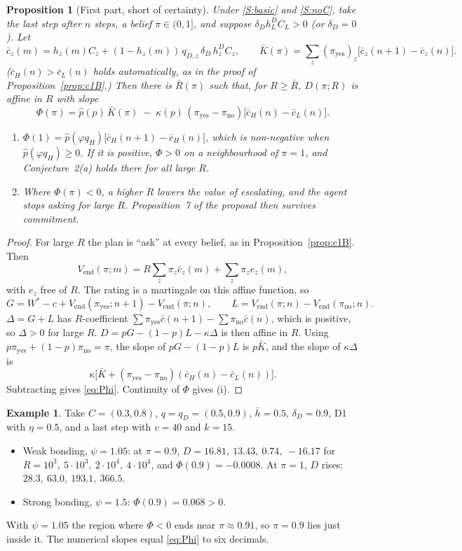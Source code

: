 \documentclass[11pt,a4paper]{article}
\newtheorem{proposition}[theorem]{Proposition}
\theoremstyle{definition}
\newtheorem{example}[theorem]{Example}
\theoremstyle{remark}
\newcommand{\Vend}{V_{\mathrm{end}}}
\newcommand{\pp}{\hat p}
\newcommand{\py}{\pi_{\mathrm{yes}}}
\newcommand{\pn}{\pi_{\mathrm{no}}}
\begin{document}
\begin{proposition}[First part, short of certainty]\label{prop:asym}
Under \ref{S:basic} and \ref{S:noC}, take the last step after $n$ steps, a belief $\pi\in(0,1]$, and suppose $\delta_Dh^D_LC_L>0$ (or $\delta_D=0$). Let
\[
\bar c_z(m)=h_z(m)C_z+(1-h_z(m))\,q_{D,z}\,\delta_D\,h^D_zC_z,\qquad \bar K(\pi)=\sum_z(\py)_z\bigl[\bar c_z(n+1)-\bar c_z(n)\bigr].
\]
($\bar c_H(n)>\bar c_L(n)$ holds automatically, as in the proof of Proposition~\ref{prop:c1B}.) Then there is $\bar R(\pi)$ such that, for $R\ge\bar R$, $D(\pi;R)$ is affine in $R$ with slope
\begin{equation}\label{eq:Phi}
\Phi(\pi)=\pp(p)\,\bar K(\pi)\;-\;\kappa(p)\,(\py-\pn)\bigl[\bar c_H(n)-\bar c_L(n)\bigr].
\end{equation}
\begin{enumerate}[label=(\roman*),nosep]
\item $\Phi(1)=\pp(\varphi q_H)\bigl[\bar c_H(n+1)-\bar c_H(n)\bigr]$, which is non-negative when $\pp(\varphi q_H)\ge0$. If it is positive, $\Phi>0$ on a neighbourhood of $\pi=1$, and Conjecture~2(a) holds there for all large $R$.
\item Where $\Phi(\pi)<0$, a higher $R$ lowers the value of escalating, and the agent stops asking for large $R$. Proposition~7 of the proposal then survives commitment.
\end{enumerate}
\end{proposition}

\begin{proof}
For large $R$ the plan is ``ask'' at every belief, as in Proposition~\ref{prop:c1B}. Then
\[
\Vend(\pi;m)=R\sum_z\pi_z\bar c_z(m)+\sum_z\pi_ze_z(m),
\]
with $e_z$ free of $R$. The rating is a martingale on this affine function, so
\[
G=W^*-c+\Vend(\py;n+1)-\Vend(\pi;n),\qquad L=\Vend(\pi;n)-\Vend(\pn;n).
\]
$\Delta=G+L$ has $R$-coefficient $\sum\py\bar c(n+1)-\sum\pn\bar c(n)$, which is positive, so $\Delta>0$ for large $R$. $D=pG-(1-p)L-\kappa\Delta$ is then affine in $R$. Using $p\py+(1-p)\pn=\pi$, the slope of $pG-(1-p)L$ is $p\bar K$, and the slope of $\kappa\Delta$ is
\[
\kappa\bigl[\bar K+(\py-\pn)(\bar c_H(n)-\bar c_L(n))\bigr].
\]
Subtracting gives \eqref{eq:Phi}. Continuity of $\Phi$ gives (i).
\end{proof}

\begin{example}\label{ex:c2a}
Take $C=(0.3,0.8)$, $q=q_D=(0.5,0.9)$, $\bar h=0.5$, $\delta_D=0.9$, D1 with $\eta=0.5$, and a last step with $v=40$ and $k=15$.
\begin{itemize}[nosep]
\item Weak bonding, $\psi=1.05$: at $\pi=0.9$, $D=16.81,\ 13.43,\ 0.74,\ -16.17$ for $R=10^3,\ 5\cdot10^3,\ 2\cdot10^4,\ 4\cdot10^4$, and $\Phi(0.9)=-0.0008$. At $\pi=1$, $D$ rises: $28.3,\ 63.0,\ 193.1,\ 366.5$.
\item Strong bonding, $\psi=1.5$: $\Phi(0.9)=0.068>0$.
\end{itemize}
With $\psi=1.05$ the region where $\Phi<0$ ends near $\pi\approx0.91$, so $\pi=0.9$ lies just inside it.
The numerical slopes equal \eqref{eq:Phi} to six decimals.
\end{example}
\end{document}
